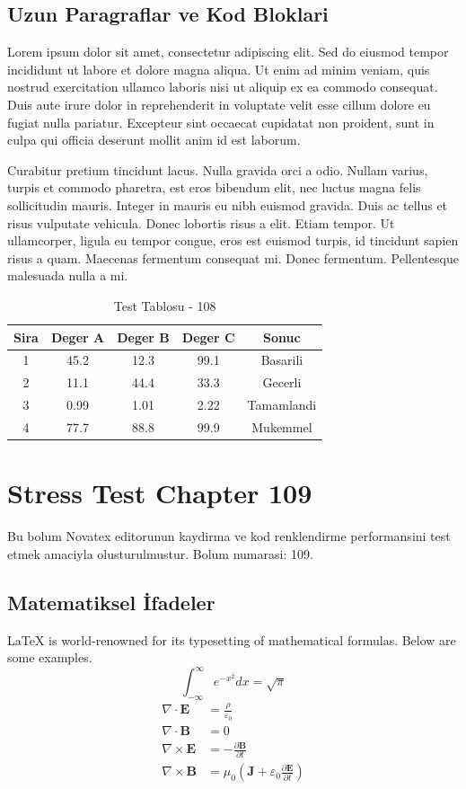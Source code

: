 \documentclass[12pt,a4paper]{article}
\begin{document}
\subsection{Uzun Paragraflar ve Kod Bloklari}
Lorem ipsum dolor sit amet, consectetur adipiscing elit. Sed do eiusmod tempor incididunt ut labore et dolore magna aliqua. Ut enim ad minim veniam, quis nostrud exercitation ullamco laboris nisi ut aliquip ex ea commodo consequat. Duis aute irure dolor in reprehenderit in voluptate velit esse cillum dolore eu fugiat nulla pariatur. Excepteur sint occaecat cupidatat non proident, sunt in culpa qui officia deserunt mollit anim id est laborum.

Curabitur pretium tincidunt lacus. Nulla gravida orci a odio. Nullam varius, turpis et commodo pharetra, est eros bibendum elit, nec luctus magna felis sollicitudin mauris. Integer in mauris eu nibh euismod gravida. Duis ac tellus et risus vulputate vehicula. Donec lobortis risus a elit. Etiam tempor. Ut ullamcorper, ligula eu tempor congue, eros est euismod turpis, id tincidunt sapien risus a quam. Maecenas fermentum consequat mi. Donec fermentum. Pellentesque malesuada nulla a mi.

\begin{table}[h!]
\centering
\begin{tabular}{|c|c|c|c|c|}
\hline
\textbf{Sira} & \textbf{Deger A} & \textbf{Deger B} & \textbf{Deger C} & \textbf{Sonuc} \\
\hline
1 & 45.2 & 12.3 & 99.1 & Basarili \\
2 & 11.1 & 44.4 & 33.3 & Gecerli \\
3 & 0.99 & 1.01 & 2.22 & Tamamlandi \\
4 & 77.7 & 88.8 & 99.9 & Mukemmel \\
\hline
\end{tabular}
\caption{Test Tablosu - 108}
\end{table}

\newpage
\section{Stress Test Chapter 109}
Bu bolum Novatex editorunun kaydirma ve kod renklendirme performansini test etmek amaciyla olusturulmustur. Bolum numarasi: 109.

\subsection{Matematiksel İfadeler}
\LaTeX{} is world-renowned for its typesetting of mathematical formulas. Below are some examples.
\begin{equation}
\int_{-\infty}^{\infty} e^{-x^2} dx = \sqrt{\pi}
\end{equation}
\begin{align}
\nabla \cdot \mathbf{E} &= \frac{\rho}{\varepsilon_0} \\
\nabla \cdot \mathbf{B} &= 0 \\
\nabla \times \mathbf{E} &= -\frac{\partial \mathbf{B}}{\partial t} \\
\nabla \times \mathbf{B} &= \mu_0\left(\mathbf{J} + \varepsilon_0 \frac{\partial \mathbf{E}}{\partial t}\right)
\end{align}
\end{document}
